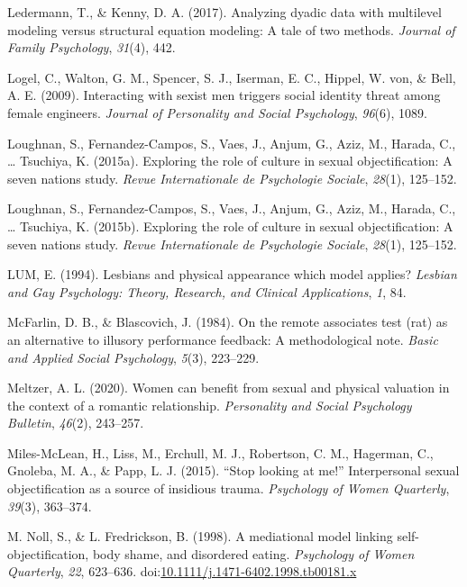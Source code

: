 \documentclass[
  man]{apa6}
\begin{document}
\leavevmode\hypertarget{ref-ledermann2017analyzing}{}%
Ledermann, T., \& Kenny, D. A. (2017). Analyzing dyadic data with multilevel modeling versus structural equation modeling: A tale of two methods. \emph{Journal of Family Psychology}, \emph{31}(4), 442.

\leavevmode\hypertarget{ref-logel2009interacting}{}%
Logel, C., Walton, G. M., Spencer, S. J., Iserman, E. C., Hippel, W. von, \& Bell, A. E. (2009). Interacting with sexist men triggers social identity threat among female engineers. \emph{Journal of Personality and Social Psychology}, \emph{96}(6), 1089.

\leavevmode\hypertarget{ref-loughnan2015exploring}{}%
Loughnan, S., Fernandez-Campos, S., Vaes, J., Anjum, G., Aziz, M., Harada, C., \ldots{} Tsuchiya, K. (2015a). Exploring the role of culture in sexual objectification: A seven nations study. \emph{Revue Internationale de Psychologie Sociale}, \emph{28}(1), 125--152.

\leavevmode\hypertarget{ref-loughnan2015}{}%
Loughnan, S., Fernandez-Campos, S., Vaes, J., Anjum, G., Aziz, M., Harada, C., \ldots{} Tsuchiya, K. (2015b). Exploring the role of culture in sexual objectification: A seven nations study. \emph{Revue Internationale de Psychologie Sociale}, \emph{28}(1), 125--152.

\leavevmode\hypertarget{ref-lum1994lesbians}{}%
LUM, E. (1994). Lesbians and physical appearance which model applies? \emph{Lesbian and Gay Psychology: Theory, Research, and Clinical Applications}, \emph{1}, 84.

\leavevmode\hypertarget{ref-mcfarlin1984remote}{}%
McFarlin, D. B., \& Blascovich, J. (1984). On the remote associates test (rat) as an alternative to illusory performance feedback: A methodological note. \emph{Basic and Applied Social Psychology}, \emph{5}(3), 223--229.

\leavevmode\hypertarget{ref-meltzer2020women}{}%
Meltzer, A. L. (2020). Women can benefit from sexual and physical valuation in the context of a romantic relationship. \emph{Personality and Social Psychology Bulletin}, \emph{46}(2), 243--257.

\leavevmode\hypertarget{ref-miles2015stop}{}%
Miles-McLean, H., Liss, M., Erchull, M. J., Robertson, C. M., Hagerman, C., Gnoleba, M. A., \& Papp, L. J. (2015). ``Stop looking at me!'' Interpersonal sexual objectification as a source of insidious trauma. \emph{Psychology of Women Quarterly}, \emph{39}(3), 363--374.

\leavevmode\hypertarget{ref-nollfredrickson1998}{}%
M. Noll, S., \& L. Fredrickson, B. (1998). A mediational model linking self-objectification, body shame, and disordered eating. \emph{Psychology of Women Quarterly}, \emph{22}, 623--636. doi:\href{https://doi.org/10.1111/j.1471-6402.1998.tb00181.x}{10.1111/j.1471-6402.1998.tb00181.x}
\end{document}
